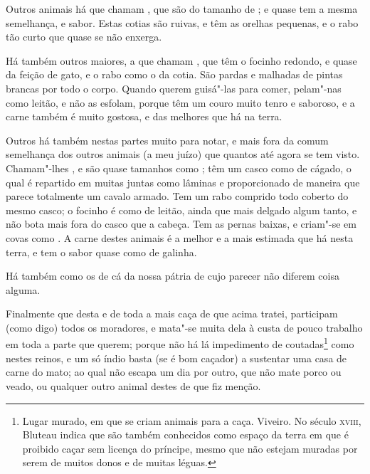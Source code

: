 Outros animais há que chamam , que são do tamanho de ; e
quase tem a mesma semelhança, e sabor. Estas cotias são ruivas, e têm
as orelhas pequenas, e o rabo tão curto que quase se não enxerga.

Há também outros maiores, a que chamam , que têm o focinho
redondo, e quase da feição de gato, e o rabo como o da cotia. São
pardas e malhadas de pintas brancas por todo o corpo. Quando querem
guisá"-las para comer, pelam"-nas como leitão, e não as esfolam, porque
têm um couro muito tenro e saboroso, e a carne também é muito gostosa, e
das melhores que há na terra.

Outros há também nestas partes muito para notar, e mais fora da comum
semelhança dos outros animais (a meu juízo) que  quantos até agora se tem
visto. Chamam"-lhes , e são quase tamanhos como ; têm um
casco como de cágado, o qual é repartido em muitas juntas como lâminas e proporcionado de maneira que parece
totalmente um cavalo armado. Tem um rabo comprido todo coberto do mesmo 			%
casco; o focinho é como de leitão, ainda que mais delgado algum tanto,
e não bota mais fora do casco que a cabeça. Tem as pernas baixas, e
criam"-se em covas como . A carne destes animais é a melhor e a
mais estimada que há nesta terra, e tem o sabor quase como de galinha.				%

Há também  como os de cá da nossa pátria de cujo parecer não
diferem coisa alguma.

Finalmente que desta e de toda a mais caça de que acima tratei,
participam (como digo) todos os moradores, e mata"-se muita dela à custa
de pouco trabalho em toda a parte que querem; porque não há lá					%
impedimento de coutadas\footnote{ Lugar murado, em que se criam animais para a
caça. Viveiro. No século \textsc{xviii}, Bluteau indica que são também conhecidos como
espaço da terra em que é proibido caçar sem licença do príncipe, mesmo que não
estejam muradas por serem de muitos donos e de muitas léguas.} como nestes
reinos, e um só índio basta (se é bom caçador) a sustentar uma casa de carne do
mato; ao qual não escapa um dia por outro, que não mate porco ou veado, ou
qualquer outro animal destes de que fiz \mbox{menção.}

